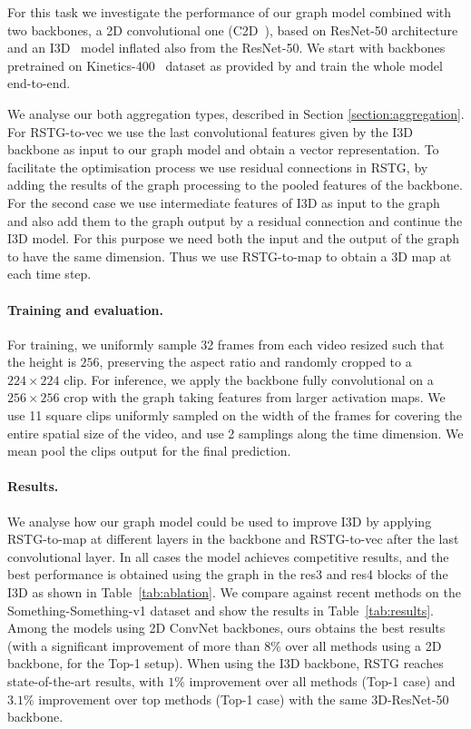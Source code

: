 \documentclass{article}
\begin{document}
For this task we investigate the performance of our graph model combined with two backbones, a 2D convolutional one (C2D~\cite{wang2018non_local}), based on ResNet-50 architecture and an I3D~\cite{carreira2017quo} model inflated also from the ResNet-50. We start with backbones pretrained on Kinetics-400~\cite{carreira2017quo} dataset as provided by \cite{wang2018non_local} and train the whole model end-to-end.

We analyse our both aggregation types, described in Section \ref{section:aggregation}. For RSTG-to-vec we use the last convolutional features given by the I3D backbone as input to our graph model and obtain a vector representation. To facilitate the optimisation process we use residual connections in RSTG, by adding the results of the graph processing to the pooled features of the backbone. For the second case we use intermediate features of I3D as input to the graph and also add them to the graph output by a residual connection and continue the I3D model. For this purpose we need both the input and the output of the graph to have the same dimension. Thus we use RSTG-to-map to obtain a 3D map at each time step. 


\paragraph{Training and evaluation.} For training, we uniformly sample 32 frames from each video resized such that the height is $256$, preserving the aspect ratio and randomly cropped to a $224 \times 224$ clip. For inference, we apply the backbone fully convolutional on a $256 \times 256$ crop with the graph taking features from larger activation maps. We use 11 square clips uniformly sampled on the width of the frames for covering the entire spatial size of the video, and use 2 samplings along the time dimension. We mean pool the clips output for the final prediction.

\newpage
\paragraph{Results.}
We analyse how our graph model could be used to improve  I3D by applying RSTG-to-map at different layers in the backbone and RSTG-to-vec after the last convolutional layer. In all cases  the model achieves competitive results, and the best performance is obtained using the graph in the res3 and res4 blocks of the I3D as shown in Table~\ref{tab:ablation}.
We compare against recent methods on the Something-Something-v1 dataset and show the results in Table~\ref{tab:results}. Among the models using 2D ConvNet backbones, ours obtains the best results (with a significant improvement of more than $8\%$ over all methods using a 2D backbone, for the Top-1 setup). When using the I3D backbone, RSTG reaches state-of-the-art results, with $1\%$ improvement over all methods (Top-1 case) and $3.1\%$ improvement over top methods (Top-1 case) with the same 3D-ResNet-50 backbone.
\end{document}
